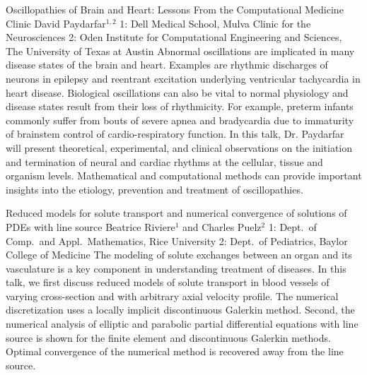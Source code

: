 \begin{addmargin}[2em]{0em}
\vspace{1.5ex}
\abs
{Oscillopathies of Brain and Heart: Lessons From the Computational Medicine Clinic}
{David Paydarfar$^{1,2}$}
{1: Dell Medical School, Mulva Clinic for the Neurosciences 2: Oden Institute for Computational Engineering and Sciences,
The University of Texas at Austin}
{Abnormal oscillations are implicated in many disease states of the brain and heart. Examples are rhythmic discharges of neurons in epilepsy and reentrant excitation underlying ventricular tachycardia in heart disease. Biological oscillations can also be vital to normal physiology and disease states result from their loss of rhythmicity. For example, preterm infants commonly suffer from bouts of severe apnea and bradycardia due to immaturity of brainstem control of cardio-respiratory function. In this talk, Dr. Paydarfar will present theoretical, experimental, and clinical observations on the initiation and termination of neural and cardiac rhythms at the cellular, tissue and organism levels. Mathematical and computational methods can provide important insights into the etiology, prevention and treatment of oscillopathies.}


\vspace{1.5ex}
\abs
{Reduced models for solute transport and numerical convergence of solutions of PDEs with line source}
{Beatrice Riviere$^{1}$ and Charles Puelz$^{2}$}
{1: Dept.~of Comp.~and Appl.~Mathematics, Rice University 2: Dept.~of Pediatrics, Baylor College of Medicine}
{The modeling of solute exchanges between an organ and its vasculature is a key component  in understanding
treatment of diseases. In this talk, we first discuss reduced models of solute transport in blood vessels of
varying cross-section and with arbitrary axial velocity profile.  The numerical discretization uses a locally
implicit discontinuous Galerkin method. Second, the numerical analysis of elliptic and parabolic partial differential equations
with line source is shown for the finite element and discontinuous Galerkin methods. Optimal convergence of the numerical
method is recovered away from the line source.}



\end{addmargin}
